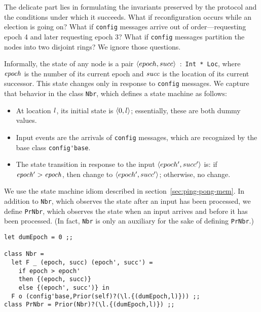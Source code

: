 \documentclass[final]{article}
\begin{document}
The delicate part lies in formulating the invariants preserved by the
protocol and the conditions under which it succeeds.  What if
reconfiguration occurs while an election is going on?  What if
\lstinline{config} messages arrive out of order---requesting epoch 4
and later requesting epoch 3?  What if \lstinline{config} messages
partition the nodes into two disjoint rings?  We ignore those
questions.


Informally, the state of any node is a pair
$\langle epoch,succ\rangle$~:~\lstinline{Int * Loc}, where $\mathit{epoch}$
is the number of its current epoch and $\mathit{succ}$ is the location
of its current successor.  This state changes only in response to
\lstinline{config} messages.  We capture that behavior in the class
\lstinline{Nbr}, which defines a state machine as follows:
\begin{itemize}
\item At location $\mathit{l}$, its initial state is
  $\langle0,l\rangle$; essentially, these are both dummy values.
\item Input events are the arrivals of \lstinline{config} messages,
  which are recognized by the base class \lstinline{config'base}.
\item The state transition in response to the input
  $\langle epoch',succ'\rangle$ is:
  if $\mathit{epoch'} > \mathit{epoch}$, then change to
  $\langle epoch',succ'\rangle$; otherwise, no change.
\end{itemize}

We use the state machine idiom described in
section~\ref{sec:ping-pong-mem}.  In addition to \lstinline{Nbr},
which observes the state after an input has been processed, we define
\lstinline{PrNbr}, which observes the state when an input arrives and
before it has been processed.  (In fact, \lstinline{Nbr} is only an
auxiliary for the sake of defining \lstinline{PrNbr}.)
\begin{emlcode}
\begin{lstlisting}
let dumEpoch = 0 ;;

class Nbr =
  let F _ (epoch, succ) (epoch', succ') =
    if epoch > epoch'
    then {(epoch, succ)}
    else {(epoch', succ')} in
  F o (config'base,Prior(self)?(\l.{(dumEpoch,l)})) ;;
class PrNbr = Prior(Nbr)?(\l.{(dumEpoch,l)}) ;;
\end{lstlisting}
\end{emlcode}

\end{document}
